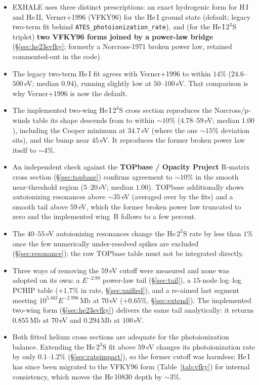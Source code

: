 \documentclass[english,a4paper]{my_memo}
\newcommand{\Mb}{\mathrm{Mb}}
\begin{document}
\begin{itemize}
\item EXHALE uses three distinct prescriptions: an exact hydrogenic form
  for H\,I and He\,II, Verner+1996 (VFKY96) for the He\,I ground state
  (default; legacy two-term fit behind \texttt{ATES\_photoionization\_rate}),
  and (for the He\,I\,$2^3$S triplet) \textbf{two VFKY96 forms joined
  by a power-law bridge} (\S\ref{sec:he23svfky}; formerly a Norcross-1971
  broken power law, retained commented-out in the code).
\item The legacy two-term He\,I fit agrees with Verner+1996 to within $14\%$
  ($24.6$--$500\,$eV; median $0.94$), running slightly low at
  $50$--$100\,$eV. That comparison is why Verner+1996 is now the default.
\item The implemented two-wing He\,I\,$2^3$S cross section reproduces the
  Norcross/p-winds table its shape descends from to within $\sim$$10\%$
  ($4.78$--$59\,$eV; median $1.00$), including the Cooper minimum at
  $34.7\,$eV (where the one $\sim$$15\%$ deviation sits), and the bump near
  $45\,$eV. It reproduces the former broken power law itself to $\sim$4\%.
\item An independent check against the \textbf{TOPbase / Opacity Project}
  R-matrix cross section (\S\ref{sec:topbase}) confirms agreement to
  $\sim$$10\%$ in the smooth near-threshold region ($5$--$20\,$eV; median
  $1.00$). TOPbase additionally shows autoionizing resonances above
  $\sim$$35\,$eV (averaged over by the fits) and a smooth tail above
  $59\,$eV, which the former broken power law truncated to zero and the
  implemented wing~B follows to a few percent.
\item The $40$--$55\,$eV autoionizing resonances change the He\,$2^3$S
  rate by less than $1\%$ once the few numerically under-resolved
  spikes are excluded (\S\ref{sec:resonance}); the raw TOPbase table must
  not be integrated directly.
\item Three ways of removing the $59\,$eV cutoff were measured and none was
  adopted on its own: a $E^{-2.99}$ power-law tail (\S\ref{sec:tail}), a
  $15$-node log--log PCHIP table ($+1.7\%$ in rate, \S\ref{sec:unified}), and a
  re-aimed last segment meeting $10^{5.462}E^{-2.996}\,\Mb$ at $70\,$eV
  ($+0.65\%$, \S\ref{sec:extend}). The implemented two-wing form
  (\S\ref{sec:he23svfky}) delivers the same tail analytically: it returns
  $0.855\,\Mb$ at $70\,$eV and $0.294\,\Mb$ at $100\,$eV.
\item Both fitted helium cross sections are adequate for the
  photoionization balance. Extending the He\,$2^3$S fit above $59\,$eV
  changes its photoionization rate by only $0.1$--$1.2\%$
  (\S\ref{sec:rateimpact}), so the former cutoff was harmless; He\,I has since
  been migrated to the VFKY96 form (Table~\ref{tab:vfky}) for internal
  consistency, which moves the He\,10830 depth by $\sim$$3\%$.
\end{itemize}
\end{document}
